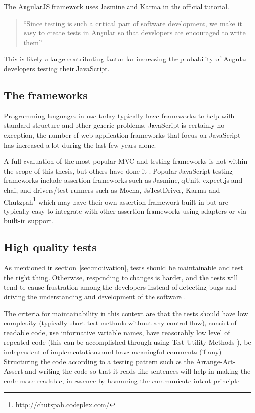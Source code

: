 \documentclass[11pt]{article}
\begin{document}
The AngularJS framework uses Jasmine and Karma in the official tutorial.

\begin{quote}
``Since testing is such a critical part of software development, we make it easy to create tests in Angular so that developers are encouraged to write them'' \cite{AngularTemplates}
\end{quote}

This is likely a large contributing factor for increasing the probability of Angular developers testing their JavaScript.

\subsection{The frameworks}
\label{sec:frameworks}

Programming languages in use today typically have frameworks to help with standard structure and other generic problems. JavaScript is certainly no exception, the number of web application frameworks that focus on JavaScript has increased a lot during the last few years alone.

A full evaluation of the most popular MVC and testing frameworks is not within the scope of this thesis, but others have done it \cite{JackFranklin}\cite{SebastianPorto}. Popular JavaScript testing frameworks include assertion frameworks such as Jasmine, qUnit, expect.js and chai, and drivers/test runners such as Mocha, JsTestDriver, Karma and Chutzpah\footnote{\url{http://chutzpah.codeplex.com/}} which may have their own assertion framework built in but are typically easy to integrate with other assertion frameworks using adapters or via built-in support.

\subsection{High quality tests}
\label{sec:quality}

As mentioned in section~\ref{sec:motivation}, tests should be maintainable and test the right thing. Otherwise, responding to changes is harder, and the tests will tend to cause frustration among the developers instead of detecting bugs and driving the understanding and development of the software \cite{Clean}.

The criteria for maintainability in this context are that the tests should have low complexity (typically short test methods without any control flow), consist of readable code, use informative variable names, have reasonably low level of repeated code (this can be accomplished through using Test Utility Methods \cite[599]{TestPatterns}), be independent of implementations and have meaningful comments (if any). Structuring the code according to a testing pattern such as the Arrange-Act-Assert \cite{C2} and writing the code so that it reads like sentences will help in making the code more readable, in essence by honouring the communicate intent principle \cite[p.~41]{TestPatterns}.
\end{document}
